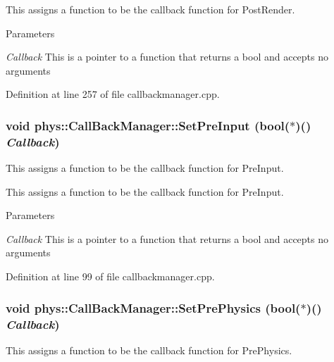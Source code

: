 This assigns a function to be the callback function for PostRender. 
\begin{DoxyParams}{Parameters}
\item[{\em Callback}]This is a pointer to a function that returns a bool and accepts no arguments \end{DoxyParams}


Definition at line 257 of file callbackmanager.cpp.

\hypertarget{classphys_1_1CallBackManager_a1efb0c185304376986093beebf08a277}{
\subsubsection[{SetPreInput}]{\setlength{\rightskip}{0pt plus 5cm}void phys::CallBackManager::SetPreInput (bool($\ast$)() {\em Callback})}}
\label{d1/d47/classphys_1_1CallBackManager_a1efb0c185304376986093beebf08a277}


This assigns a function to be the callback function for PreInput. 

This assigns a function to be the callback function for PreInput. 
\begin{DoxyParams}{Parameters}
\item[{\em Callback}]This is a pointer to a function that returns a bool and accepts no arguments \end{DoxyParams}


Definition at line 99 of file callbackmanager.cpp.

\hypertarget{classphys_1_1CallBackManager_a3f06ccacd416b3109f20c30cd30f9efe}{
\subsubsection[{SetPrePhysics}]{\setlength{\rightskip}{0pt plus 5cm}void phys::CallBackManager::SetPrePhysics (bool($\ast$)() {\em Callback})}}
\label{d1/d47/classphys_1_1CallBackManager_a3f06ccacd416b3109f20c30cd30f9efe}


This assigns a function to be the callback function for PrePhysics. 

